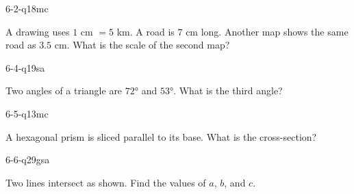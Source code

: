 \begin{practiceQuestion}{6-2-q18}{mc}
\begin{questionText}
A drawing uses $1$ cm $= 5$ km. A road is $7$ cm long. Another map shows the same road as $3.5$ cm. What is the scale of the second map?
\end{questionText}
\end{practiceQuestion}

\begin{practiceQuestion}{6-4-q19}{sa}
\begin{questionText}
Two angles of a triangle are $72°$ and $53°$. What is the third angle?
\end{questionText}
\end{practiceQuestion}

\begin{practiceQuestion}{6-5-q13}{mc}
\begin{questionText}
A hexagonal prism is sliced parallel to its base. What is the cross-section?
\end{questionText}
\end{practiceQuestion}

\begin{practiceQuestion}{6-6-q29}{gsa}
\begin{questionText}
Two lines intersect as shown. Find the values of $a$, $b$, and $c$.

\begin{center}
\end{center}
\end{questionText}
\end{practiceQuestion}

